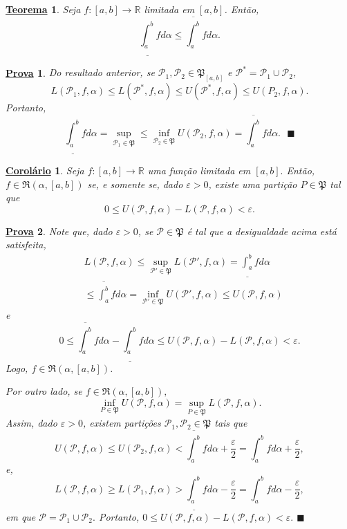 \documentclass{article}
\newtheorem*{theorem*}{\underline{Teorema}}
\newtheorem*{proof*}{\underline{Prova}}
\newtheorem*{crl*}{\underline{Corol\'ario}}
\renewcommand\qedsymbol{$\blacksquare$}
\begin{document}
\begin{theorem*}
  Seja \(f:[a, b]\rightarrow \mathbb{R}\) limitada em \([a, b]\). Então, 
    \[
      \underline{\int_{a}^{b}} f d\alpha\leq \overline{\int_{a}^{b}}f d\alpha .
    \]
\end{theorem*}
\begin{proof*}
  Do resultado anterior, se \(\mathcal{P}_{1}, \mathcal{P}_{2}\in \mathfrak{P}_{[a, b]}\) e \(\mathcal{P}^{*} = \mathcal{P}_{1}\cup \mathcal{P}_{2}\), 
    \[
      L(\mathcal{P}_{1}, f, \alpha )\leq L(\mathcal{P}^{*}, f, \alpha )\leq U(\mathcal{P}^{*}, f, \alpha )\leq U(P_{2}, f, \alpha ).
    \]
  Portanto, 
    \[
      \underline{\int_{a}^{b}}f d\alpha =\sup_{\mathcal{P_{1}}\in \mathfrak{P}}\leq \inf_{\mathcal{P}_{2}\in \mathfrak{P}} U(\mathcal{P}_{2}, f, \alpha ) = \overline{\int_{a}^{b}}f d\alpha .\text{ \qedsymbol}
    \]
\end{proof*}
\begin{crl*}
  Seja \(f:[a, b]\rightarrow \mathbb{R}\) uma fun\c cão limitada em \([a, b].\) Então, \(f\in \mathfrak{R}(\alpha , [a, b])\) se, e somente se, 
  dado \(\varepsilon >0\), existe uma parti\c cão \(P\in \mathfrak{P}\) tal que 
    \[
      0\leq U(\mathcal{P}, f, \alpha ) - L(\mathcal{P}, f, \alpha ) <\varepsilon .
    \]
\end{crl*}
\begin{proof*}
  Note que, dado \(\varepsilon  >0\), se \(\mathcal{P}\in \mathfrak{P}\) é tal que a desigualdade acima está satisfeita,
 \begin{align*}
   &L(\mathcal{P}, f, \alpha )\leq \sup_{\mathcal{P}'\in \mathfrak{P}}L(\mathcal{P}', f, \alpha ) = \underline{\int_{a}^{b}}f d\alpha \\
   &\leq \overline{\int_{a}^{b}}f d\alpha = \inf_{\mathcal{P}'\in \mathfrak{P}}U(\mathcal{P}', f, \alpha )\leq U(\mathcal{P}, f, \alpha )
 \end{align*}
 e 
   \[
     0\leq \overline{\int_{a}^{b}}f d\alpha  - \underline{\int_{a}^{b}}f d\alpha\leq U(\mathcal{P}, f, \alpha ) - L(\mathcal{P}, f,\alpha ) <\varepsilon .
   \]
  Logo, \(f\in \mathfrak{R}(\alpha, [a,b])\).

  Por outro lado, se \(f\in \mathfrak{R}(\alpha , [a,b]),\) 
    \[
      \inf_{P\in \mathfrak{P}}U(\mathcal{P}, f, \alpha ) = \sup_{P\in \mathfrak{P}}L(\mathcal{P}, f, \alpha ).
    \]
  Assim, dado \(\varepsilon >0\), existem parti\c cões \(\mathcal{P}_{1}, \mathcal{P}_{2}\in \mathfrak{P}\) tais que 
    \[
      U(\mathcal{P}, f, \alpha )\leq U(\mathcal{P}_{2}, f, \alpha ) < \overline{\int_{a}^{b}}f d\alpha +\frac{\varepsilon }{2} = \int_{a}^{b} f d\alpha  + \frac{\varepsilon }{2},
    \]
  e, 
    \[
      L(\mathcal{P}, f, \alpha )\geq L(\mathcal{P}_{1}, f, \alpha ) > \underline{\int_{a}^{b}} f d\alpha - \frac{\varepsilon }{2} = \int_{a}^{b}f d\alpha - \frac{\varepsilon }{2},
    \]
  em que \(\mathcal{P} = \mathcal{P}_{1}\cup \mathcal{P}_{2}.\) Portanto, \(0\leq U(\mathcal{P}, f, \alpha ) - L(\mathcal{P}, f, \alpha ) < \varepsilon .\) \qedsymbol
\end{proof*} 
\end{document}
